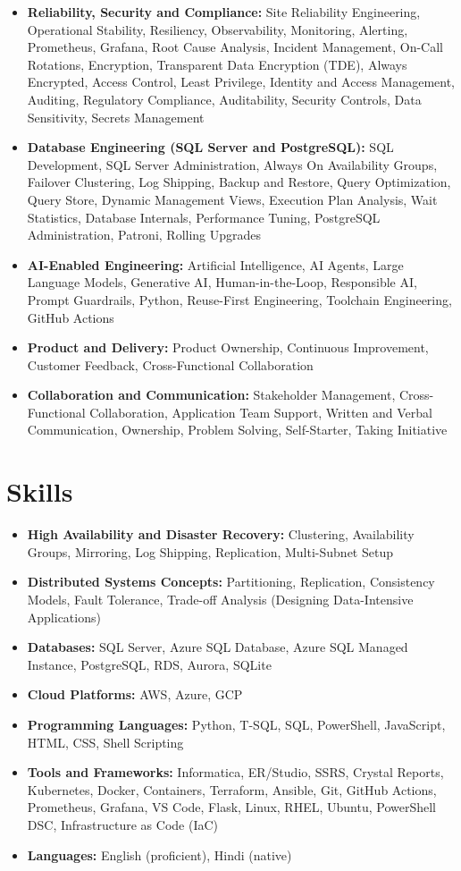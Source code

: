 \documentclass[10pt,a4paper]{article}
\begin{document}
\begin{itemize}
  \item \textbf{Reliability, Security and Compliance:} Site Reliability Engineering, Operational Stability, Resiliency, Observability, Monitoring, Alerting, Prometheus, Grafana, Root Cause Analysis, Incident Management, On-Call Rotations, Encryption, Transparent Data Encryption (TDE), Always Encrypted, Access Control, Least Privilege, Identity and Access Management, Auditing, Regulatory Compliance, Auditability, Security Controls, Data Sensitivity, Secrets Management
  \item \textbf{Database Engineering (SQL Server and PostgreSQL):} SQL Development, SQL Server Administration, Always On Availability Groups, Failover Clustering, Log Shipping, Backup and Restore, Query Optimization, Query Store, Dynamic Management Views, Execution Plan Analysis, Wait Statistics, Database Internals, Performance Tuning, PostgreSQL Administration, Patroni, Rolling Upgrades
  \item \textbf{AI-Enabled Engineering:} Artificial Intelligence, AI Agents, Large Language Models, Generative AI, Human-in-the-Loop, Responsible AI, Prompt Guardrails, Python, Reuse-First Engineering, Toolchain Engineering, GitHub Actions
  \item \textbf{Product and Delivery:} Product Ownership, Continuous Improvement, Customer Feedback, Cross-Functional Collaboration
  \item \textbf{Collaboration and Communication:} Stakeholder Management, Cross-Functional Collaboration, Application Team Support, Written and Verbal Communication, Ownership, Problem Solving, Self-Starter, Taking Initiative
\end{itemize}

\section{Skills}
\begin{itemize}
  \item \textbf{High Availability and Disaster Recovery:} Clustering, Availability Groups, Mirroring, Log Shipping, Replication, Multi-Subnet Setup
  \item \textbf{Distributed Systems Concepts:} Partitioning, Replication, Consistency Models, Fault Tolerance, Trade-off Analysis (Designing Data-Intensive Applications)
  \item \textbf{Databases:} SQL Server, Azure SQL Database, Azure SQL Managed Instance, PostgreSQL, RDS, Aurora, SQLite
  \item \textbf{Cloud Platforms:} AWS, Azure, GCP
  \item \textbf{Programming Languages:} Python, T-SQL, SQL, PowerShell, JavaScript, HTML, CSS, Shell Scripting
  \item \textbf{Tools and Frameworks:} Informatica, ER/Studio, SSRS, Crystal Reports, Kubernetes, Docker, Containers, Terraform, Ansible, Git, GitHub Actions, Prometheus, Grafana, VS Code, Flask, Linux, RHEL, Ubuntu, PowerShell DSC, Infrastructure as Code (IaC)
  \item \textbf{Languages:} English (proficient), Hindi (native)
\end{itemize}
\end{document}
